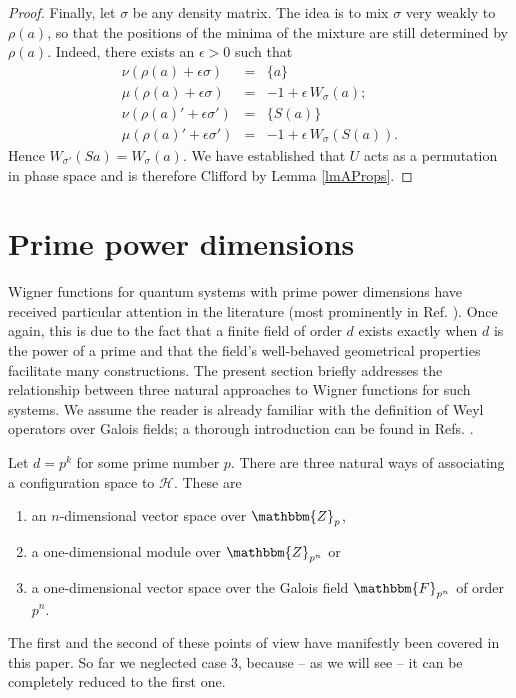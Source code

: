 \documentclass[aps,twocolumn,floatfix]{revtex4}
\def\ZZ{\mathbbm{Z}}
\def\FF{\mathbbm{F}}
\def\H{\mathcal{H}}
\begin{document}
\begin{proof}
	Finally, let $\sigma$ be any density matrix. The idea is to mix
	$\sigma$ very weakly to $\rho(a)$, so that the positions of the
	minima of the mixture are still determined by $\rho(a)$.
	Indeed, there exists an $\epsilon>0$ such that
	\begin{eqnarray*}
		\nu(\rho(a) + \epsilon \sigma)&=&\{a\}\\
		\mu(\rho(a) + \epsilon \sigma)&=&-1+\epsilon\, W_\sigma(a);\\
		\nu(\rho(a)' + \epsilon \sigma')&=&\{S(a)\}\\
		\mu(\rho(a)' + \epsilon \sigma')&=&-1+\epsilon\, W_\sigma(S(a)).
	\end{eqnarray*}
	Hence $W_{\sigma'}(Sa)=W_\sigma(a)$. We have established that $U$
	acts as a permutation in phase space and is therefore Clifford by
	Lemma \ref{lmAProps}.
\end{proof}

\section{Prime power dimensions}
\label{scPrimePower}

Wigner functions for quantum systems with prime power dimensions have
received particular attention in the literature (most prominently in
Ref. \cite{wootters}). Once again, this is due to the fact that a
finite field of order $d$ exists exactly when $d$ is the power of a
prime and that the field's well-behaved geometrical properties
facilitate many constructions. The present section briefly addresses
the relationship between three natural approaches to Wigner functions
for such systems. We assume the reader is already familiar with the
definition of Weyl operators over Galois fields; a thorough
introduction can be found in Refs. \cite{wootters,diploma}.

Let $d=p^k$ for some prime number $p$. There are three natural ways of
associating a configuration space to $\H$. These are
\begin{enumerate}
	\item\label{primePowerOne}
	an $n$-dimensional vector space over $\ZZ_p$,
	
	\item
	a one-dimensional module over $\ZZ_{p^n}$ or
	
	\item\label{primePowerThree}
	a one-dimensional vector space over the Galois field $\FF_{p^n}$ of
	order $p^n$.
\end{enumerate}
The first and the second of these points of view have manifestly been
covered in this paper. So far we neglected case 3, because -- as we
will see -- it can be completely reduced to the first one.
\end{document}
